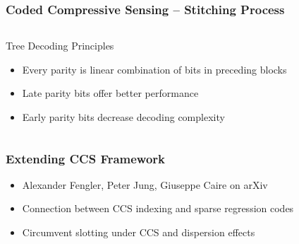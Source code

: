 \documentclass[10pt]{beamer}
\begin{document}
\begin{frame}
\frametitle{Coded Compressive Sensing -- Stitching Process}
  \begin{center}
  
  \end{center}
\begin{columns}
\begin{block}{Tree Decoding Principles}
  \begin{itemize}
  \item Every parity is linear combination of bits in preceding blocks
  \item Late parity bits offer better performance
  \item Early parity bits decrease decoding complexity
  \end{itemize}
\end{block}
  \centerline{\scalebox{0.5}{}}
\end{columns}
\end{frame}


\begin{frame}
\frametitle{Extending CCS Framework}
\begin{center}
\end{center}
  \begin{itemize}
  \item Alexander Fengler, Peter Jung, Giuseppe Caire on arXiv
  \item Connection between CCS indexing and sparse regression codes
  \item Circumvent slotting under CCS and dispersion effects
  \end{itemize}
\end{frame}
\end{document}
